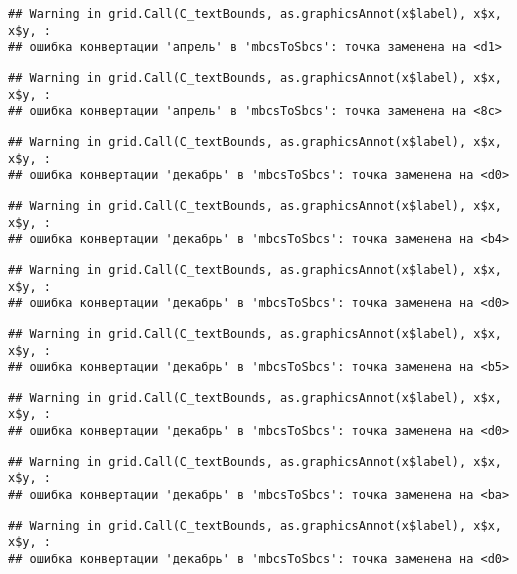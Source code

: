 \documentclass[
]{article}
\begin{document}
\begin{verbatim}
## Warning in grid.Call(C_textBounds, as.graphicsAnnot(x$label), x$x, x$y, :
## ошибка конвертации 'апрель' в 'mbcsToSbcs': точка заменена на <d1>
\end{verbatim}

\begin{verbatim}
## Warning in grid.Call(C_textBounds, as.graphicsAnnot(x$label), x$x, x$y, :
## ошибка конвертации 'апрель' в 'mbcsToSbcs': точка заменена на <8c>
\end{verbatim}

\begin{verbatim}
## Warning in grid.Call(C_textBounds, as.graphicsAnnot(x$label), x$x, x$y, :
## ошибка конвертации 'декабрь' в 'mbcsToSbcs': точка заменена на <d0>
\end{verbatim}

\begin{verbatim}
## Warning in grid.Call(C_textBounds, as.graphicsAnnot(x$label), x$x, x$y, :
## ошибка конвертации 'декабрь' в 'mbcsToSbcs': точка заменена на <b4>
\end{verbatim}

\begin{verbatim}
## Warning in grid.Call(C_textBounds, as.graphicsAnnot(x$label), x$x, x$y, :
## ошибка конвертации 'декабрь' в 'mbcsToSbcs': точка заменена на <d0>
\end{verbatim}

\begin{verbatim}
## Warning in grid.Call(C_textBounds, as.graphicsAnnot(x$label), x$x, x$y, :
## ошибка конвертации 'декабрь' в 'mbcsToSbcs': точка заменена на <b5>
\end{verbatim}

\begin{verbatim}
## Warning in grid.Call(C_textBounds, as.graphicsAnnot(x$label), x$x, x$y, :
## ошибка конвертации 'декабрь' в 'mbcsToSbcs': точка заменена на <d0>
\end{verbatim}

\begin{verbatim}
## Warning in grid.Call(C_textBounds, as.graphicsAnnot(x$label), x$x, x$y, :
## ошибка конвертации 'декабрь' в 'mbcsToSbcs': точка заменена на <ba>
\end{verbatim}

\begin{verbatim}
## Warning in grid.Call(C_textBounds, as.graphicsAnnot(x$label), x$x, x$y, :
## ошибка конвертации 'декабрь' в 'mbcsToSbcs': точка заменена на <d0>
\end{verbatim}
\end{document}
